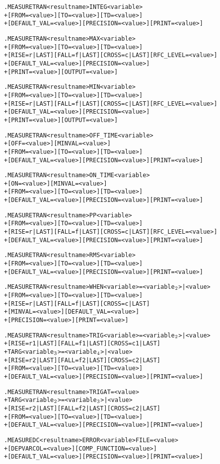 \begin{Command}
\begin{alltt}
.MEASURE TRAN <result name> INTEG <variable>
+ [FROM=<value>] [TO=<value>] [TD=<value>]
+ [DEFAULT_VAL=<value>] [PRECISION=<value>] [PRINT=<value>]

.MEASURE TRAN <result name> MAX <variable>
+ [FROM=<value>] [TO=<value>] [TD=<value>]
+ [RISE=r|LAST] [FALL=f|LAST] [CROSS=c|LAST] [RFC_LEVEL=<value>]
+ [DEFAULT_VAL=<value>] [PRECISION=<value>] 
+ [PRINT=<value>] [OUTPUT=<value>]

.MEASURE TRAN <result name> MIN <variable>
+ [FROM=<value>] [TO=<value>] [TD=<value>]
+ [RISE=r|LAST] [FALL=f|LAST] [CROSS=c|LAST] [RFC_LEVEL=<value>]
+ [DEFAULT_VAL=<value>] [PRECISION=<value>] 
+ [PRINT=<value>] [OUTPUT=<value>]

.MEASURE TRAN <result name> OFF_TIME <variable>
+ [OFF=<value>] [MINVAL=<value>]
+ [FROM=<value>] [TO=<value>] [TD=<value>]
+ [DEFAULT_VAL=<value>] [PRECISION=<value>] [PRINT=<value>]

.MEASURE TRAN <result name> ON_TIME <variable>
+ [ON=<value>] [MINVAL=<value>]
+ [FROM=<value>] [TO=<value>] [TD=<value>]
+ [DEFAULT_VAL=<value>] [PRECISION=<value>] [PRINT=<value>]

.MEASURE TRAN <result name> PP <variable>
+ [FROM=<value>] [TO=<value>] [TD=<value>]
+ [RISE=r|LAST] [FALL=f|LAST] [CROSS=c|LAST] [RFC_LEVEL=<value>]
+ [DEFAULT_VAL=<value>] [PRECISION=<value>] [PRINT=<value>]

.MEASURE TRAN <result name> RMS <variable>
+ [FROM=<value>] [TO=<value>] [TD=<value>]
+ [DEFAULT_VAL=<value>] [PRECISION=<value>] [PRINT=<value>]

.MEASURE TRAN <result name> WHEN <variable>=<variable\(\sb{2}\)>|<value>
+ [FROM=<value>] [TO=<value>] [TD=<value>] 
+ [RISE=r|LAST] [FALL=f|LAST] [CROSS=c|LAST]
+ [MINVAL=<value>] [DEFAULT_VAL=<value>] 
+ [PRECISION=<value>] [PRINT=<value>]

.MEASURE TRAN <result name> TRIG <variable>=<variable\(\sb{2}\)>|<value>
+ [RISE=r1|LAST] [FALL=f1|LAST] [CROSS=c1|LAST]
+ TARG <variable\(\sb{3}\)>=<variable\(\sb{4}\)>|<value> 
+ [RISE=r2|LAST] [FALL=f2|LAST] [CROSS=c2|LAST]
+ [FROM=<value>] [TO=<value>] [TD=<value>] 
+ [DEFAULT_VAL=<value>] [PRECISION=<value>] [PRINT=<value>]

.MEASURE TRAN <result name> TRIG AT=<value>
+ TARG <variable\(\sb{2}\)>=<variable\(\sb{3}\)>|<value> 
+ [RISE=r2|LAST] [FALL=f2|LAST] [CROSS=c2|LAST]
+ [FROM=<value>] [TO=<value>] [TD=<value>] 
+ [DEFAULT_VAL=<value>] [PRECISION=<value>] [PRINT=<value>]

.MEASURE DC <result name> ERROR <variable> FILE=<value>
+ [DEPVARCOL=<value>] [COMP_FUNCTION=<value>]
+ [DEFAULT_VAL=<value>] [PRECISION=<value>] [PRINT=<value>]


\end{alltt}
\end{Command}
